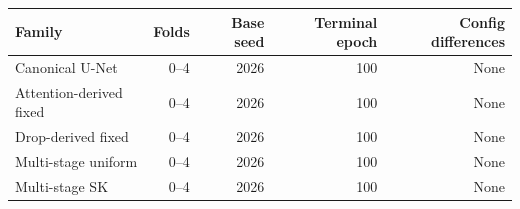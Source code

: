\begin{tabular}{lrrrr}
\toprule
Family & Folds & Base seed & Terminal epoch & Config differences \\
\midrule
Canonical U-Net & 0--4 & 2026 & 100 & None \\
Attention-derived fixed & 0--4 & 2026 & 100 & None \\
Drop-derived fixed & 0--4 & 2026 & 100 & None \\
Multi-stage uniform & 0--4 & 2026 & 100 & None \\
Multi-stage SK & 0--4 & 2026 & 100 & None \\
\bottomrule
\end{tabular}
